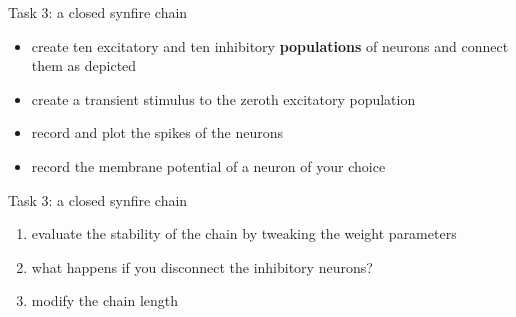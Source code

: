 \documentclass[aspectratio=169]{beamer}
\begin{document}
\begin{frame}{Task 3: a closed synfire chain}
\begin{center}
	\end{center}
		\begin{itemize}
			\item create ten excitatory and ten inhibitory \textbf{populations} of neurons and connect them as depicted
			\item create a transient stimulus to the zeroth excitatory population
			\item record and plot the spikes of the neurons
			\item record the membrane potential of a neuron of your choice
		\end{itemize}
\end{frame}

\begin{frame}{Task 3: a closed synfire chain}
	\begin{enumerate}
		\item evaluate the stability of the chain by tweaking the weight parameters
		\item what happens if you disconnect the inhibitory neurons?
		\item modify the chain length
	\end{enumerate}
\end{frame}
\end{document}
